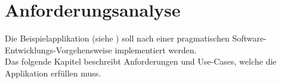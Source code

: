 \chapter{Anforderungsanalyse}

Die Beispielapplikation (siehe ) soll nach einer pragmatischen Software-Entwicklungs-Vorgehensweise implementiert werden.\\
Das folgende Kapitel beschreibt Anforderungen und Use-Cases, welche die Applikation erfüllen muss.




